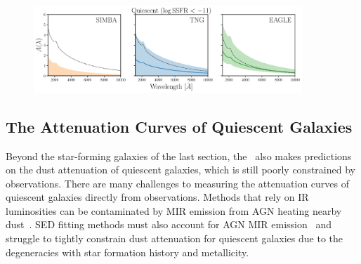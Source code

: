 \begin{figure}
\begin{center}
    \includegraphics[width=0.9\textwidth]{figs/abc_q_atten_unnorm.pdf}
    \caption{\label{fig:q_raw_atten}
    }
\end{center}
\end{figure}
\subsection{The Attenuation Curves of Quiescent Galaxies}  
Beyond the star-forming galaxies of the last section, the \eda~also makes
predictions on the dust attenuation of quiescent galaxies, which is still
poorly constrained by observations. 
There are many challenges to measuring the attenuation curves of quiescent galaxies directly from observations.
Methods that rely on IR luminosities can be contaminated by MIR emission
from AGN heating nearby dust~\citep{kirkpatrick2015}. 
SED fitting methods must also account for AGN MIR
emission~\citep{salim2016, leja2018, salim2018} and struggle to tightly
constrain dust attenuation for quiescent galaxies due to the degeneracies
with star formation history and metallicity.


